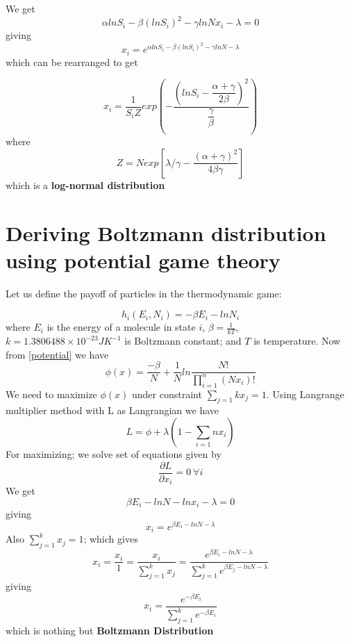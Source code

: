 \documentclass[letterpaper,english,12pt]{article}
\begin{document}
 We get 
 \begin{equation}
    \alpha ln S_i-\beta (ln S_i)^2 - \gamma ln Nx_i - \lambda = 0
 \end{equation}
 giving
 \begin{equation}
     x_i = e ^ {\alpha ln S_i - \beta (ln S_i)^2 - \gamma ln N -\lambda}
 \end{equation}
 which can be rearranged to get
 
 \begin{equation}\label{fairpotential}
     x_i = \dfrac{1}{S_i Z}exp(-\dfrac{(lnS_i - \dfrac{\alpha+\gamma}{2\beta})^2 }{\dfrac{\gamma}{\beta}})
 \end{equation}
 where 
 \begin{equation}
     Z = N exp[\lambda/\gamma - \dfrac{(\alpha + \gamma)^2}{4\beta \gamma}]
 \end{equation}
 which is a \textbf{log-normal distribution}
 

\section{Deriving Boltzmann distribution using potential game theory}
Let us define the payoff of particles in the thermodynamic game:

\begin{equation}\label{thermogame}
    h_i(E_i,N_i) = -\beta E_i - ln N_i
\end{equation}
where $E_i$ is the energy of a molecule in state $i$, $\beta=\frac{1}{kT}$, $k=1.3806488 \times 10^{-23} JK^{-1}$ is Boltzmann constant; and $T$ is temperature.
 Now from \ref{potential} we have 
 \begin{equation}
 \phi(x) = \frac{-\beta}{N}+ \frac{1}{N}ln\frac{N!}{\prod_{i=1}^{n}(Nx_i)!}
 \end{equation}
 We need to maximize $\phi(x)$ under constraint $\sum_{j=1}{k}x_j = 1$.
 Using Langrange multiplier method with L as Langrangian we have
 \begin{equation}
     L=\phi + \lambda(1-\sum_{i=1}{n}x_i)
 \end{equation}
 For maximizing; we solve set of equations given by
 \begin{equation}
     \frac{\partial L}{\partial x_i} =0 ~ \forall i
 \end{equation}
 We get 
 \begin{equation}
     \beta E_i  - ln N - ln x_i -\lambda = 0 
 \end{equation}
 giving
 \begin{equation}
     x_i = e ^ {\beta E_i  - ln N  -\lambda}
 \end{equation}
 Also $\sum_{j=1}^{k}x_j=1$; which gives
 \begin{equation}
     x_i = \frac{x_i}{1} = \frac{x_i}{\sum_{j=1}^{k}x_j} = \frac{e ^ {\beta E_i  - ln N  -\lambda}}{\sum_{j=1}^{k}e ^ {\beta E_j  - ln N  -\lambda}}
 \end{equation}
 giving
 \begin{equation}
     x_i = \frac{e^{-\beta E_i}}{\sum_{j=1}^{k}e^{-\beta E_i}}
 \end{equation}
 which is nothing but \textbf{Boltzmann Distribution}
 
\end{document}
